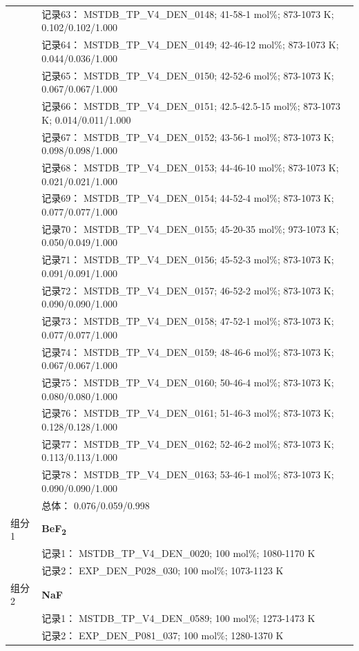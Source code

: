 \documentclass[12pt]{article}
\begin{document}
{\begin{longtable}[]{@{}
  >{\raggedright\arraybackslash}p{}
  >{\raggedright\arraybackslash}p{}@{}}
 & 记录63： MSTDB\_TP\_V4\_DEN\_0148; 41-58-1 mol\%; 873-1073 K; 0.102/0.102/1.000 \\
 & 记录64： MSTDB\_TP\_V4\_DEN\_0149; 42-46-12 mol\%; 873-1073 K; 0.044/0.036/1.000 \\
 & 记录65： MSTDB\_TP\_V4\_DEN\_0150; 42-52-6 mol\%; 873-1073 K; 0.067/0.067/1.000 \\
 & 记录66： MSTDB\_TP\_V4\_DEN\_0151; 42.5-42.5-15 mol\%; 873-1073 K; 0.014/0.011/1.000 \\
 & 记录67： MSTDB\_TP\_V4\_DEN\_0152; 43-56-1 mol\%; 873-1073 K; 0.098/0.098/1.000 \\
 & 记录68： MSTDB\_TP\_V4\_DEN\_0153; 44-46-10 mol\%; 873-1073 K; 0.021/0.021/1.000 \\
 & 记录69： MSTDB\_TP\_V4\_DEN\_0154; 44-52-4 mol\%; 873-1073 K; 0.077/0.077/1.000 \\
 & 记录70： MSTDB\_TP\_V4\_DEN\_0155; 45-20-35 mol\%; 973-1073 K; 0.050/0.049/1.000 \\
 & 记录71： MSTDB\_TP\_V4\_DEN\_0156; 45-52-3 mol\%; 873-1073 K; 0.091/0.091/1.000 \\
 & 记录72： MSTDB\_TP\_V4\_DEN\_0157; 46-52-2 mol\%; 873-1073 K; 0.090/0.090/1.000 \\
 & 记录73： MSTDB\_TP\_V4\_DEN\_0158; 47-52-1 mol\%; 873-1073 K; 0.077/0.077/1.000 \\
 & 记录74： MSTDB\_TP\_V4\_DEN\_0159; 48-46-6 mol\%; 873-1073 K; 0.067/0.067/1.000 \\
 & 记录75： MSTDB\_TP\_V4\_DEN\_0160; 50-46-4 mol\%; 873-1073 K; 0.080/0.080/1.000 \\
 & 记录76： MSTDB\_TP\_V4\_DEN\_0161; 51-46-3 mol\%; 873-1073 K; 0.128/0.128/1.000 \\
 & 记录77： MSTDB\_TP\_V4\_DEN\_0162; 52-46-2 mol\%; 873-1073 K; 0.113/0.113/1.000 \\
 & 记录78： MSTDB\_TP\_V4\_DEN\_0163; 53-46-1 mol\%; 873-1073 K; 0.090/0.090/1.000 \\
 & 总体： 0.076/0.059/0.998  \\

组分 1  & \textbf{BeF\textsubscript{2}} \\
 & 记录1： MSTDB\_TP\_V4\_DEN\_0020; 100 mol\%; 1080-1170 K \\
 & 记录2： EXP\_DEN\_P028\_030; 100 mol\%; 1073-1123 K  \\

组分 2  & \textbf{NaF} \\
 & 记录1： MSTDB\_TP\_V4\_DEN\_0589; 100 mol\%; 1273-1473 K \\
 & 记录2： EXP\_DEN\_P081\_037; 100 mol\%; 1280-1370 K  \\


\end{longtable}}
\end{document}
